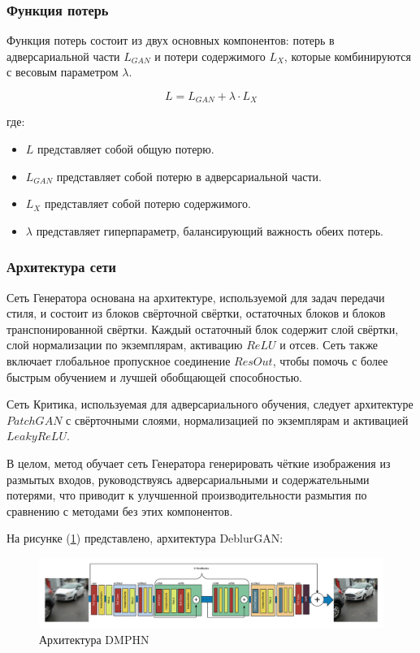 \subsubsection*{Функция потерь}

Функция потерь состоит из двух основных компонентов: потерь в адверсариальной части \(L_{GAN}\) и потери содержимого \(L_{X}\), которые комбинируются с весовым параметром \(\lambda\).

\begin{equation}
	L = L_{GAN} + \lambda \cdot L_{X}
\end{equation}

где:
\begin{itemize}
	\item \(L\) представляет собой общую потерю.
	\item \(L_{GAN}\) представляет собой потерю в адверсариальной части.
	\item \(L_{X}\) представляет собой потерю содержимого.
	\item \(\lambda\) представляет гиперпараметр, балансирующий важность обеих потерь.
\end{itemize}

\subsubsection*{Архитектура сети}

Сеть Генератора основана на архитектуре, используемой для задач передачи стиля, и состоит из блоков свёрточной свёртки, остаточных блоков и блоков транспонированной свёртки. Каждый остаточный блок содержит слой свёртки, слой нормализации по экземплярам, активацию \(ReLU\) и отсев. Сеть также включает глобальное пропускное соединение \(ResOut\), чтобы помочь с более быстрым обучением и лучшей обобщающей способностью.

Сеть Критика, используемая для адверсариального обучения, следует архитектуре \(PatchGAN\) с свёрточными слоями, нормализацией по экземплярам и активацией \(LeakyReLU\).

В целом, метод обучает сеть Генератора генерировать чёткие изображения из размытых входов, руководствуясь адверсариальными и содержательными потерями, что приводит к улучшенной производительности размытия по сравнению с методами без этих компонентов.

На рисунке (\ref{fig:deblur-gan}) представлено, архитектура DeblurGAN: 
\begin{figure}[H]
	\centering
	\includegraphics[width=1\linewidth]{assets/deblur-gan.png}
	\caption{Архитектура DMPHN}
	\label{fig:deblur-gan}
\end{figure}


